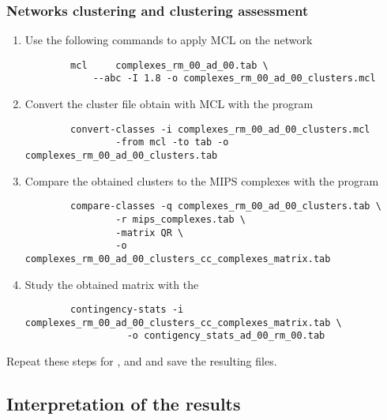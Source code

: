 \subsubsection{Networks clustering and clustering assessment}
\begin{enumerate}
  \item Use the following commands to apply MCL on the network
  {\color{Blue} \begin{footnotesize} 
		\begin{verbatim}
  		mcl 	complexes_rm_00_ad_00.tab \
  			--abc -I 1.8 -o complexes_rm_00_ad_00_clusters.mcl
  \end{verbatim} \end{footnotesize}}
  \item Convert the cluster file obtain with MCL with the program 
    {\color{Blue} \begin{footnotesize} 
		\begin{verbatim}
  		convert-classes	-i complexes_rm_00_ad_00_clusters.mcl 
  				-from mcl -to tab -o complexes_rm_00_ad_00_clusters.tab 
  \end{verbatim} \end{footnotesize}}
  \item Compare the obtained clusters to the MIPS complexes with the program 
    {\color{Blue} \begin{footnotesize} 
		\begin{verbatim}
  		compare-classes	-q complexes_rm_00_ad_00_clusters.tab \
  				-r mips_complexes.tab \
  				-matrix QR \
  				-o complexes_rm_00_ad_00_clusters_cc_complexes_matrix.tab 
  \end{verbatim} \end{footnotesize} } 
  \item Study the obtained matrix with the 
    {\color{Blue} \begin{footnotesize} 
		\begin{verbatim}
		contingency-stats -i complexes_rm_00_ad_00_clusters_cc_complexes_matrix.tab \
				  -o contigency_stats_ad_00_rm_00.tab
  \end{verbatim} \end{footnotesize}  }  
\end{enumerate}

Repeat these steps for \file{complexes\_rm\_10\_ad\_10.tab},  and  and save the resulting files.


\subsection{Interpretation of the results}